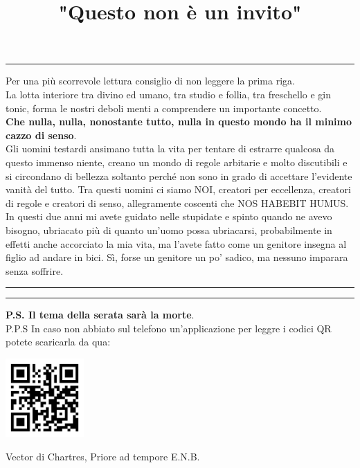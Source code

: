 \documentclass{article}
\title{"Questo non è un invito"}
\newcommand{\bb}[1]{\textbf{#1}}
\begin{document}
\maketitle
\hrule
\vspace{0.5cm}
Per una più scorrevole lettura consiglio di non leggere la prima riga.\\
La lotta interiore tra divino ed umano, tra studio e follia, tra freschello e gin tonic, forma le nostri deboli menti a comprendere un importante concetto.\\
\bb{Che nulla, nulla, nonostante tutto, nulla in questo mondo ha il minimo cazzo di senso}.\\
Gli uomini testardi ansimano tutta la vita per tentare di estrarre qualcosa da questo immenso niente, creano un mondo di regole arbitarie e molto discutibili e si circondano di bellezza soltanto perché non sono in grado di accettare l'evidente vanità del tutto.
Tra questi uomini ci siamo NOI, creatori per eccellenza, creatori di regole e creatori di senso, allegramente coscenti che NOS HABEBIT HUMUS.\\
In questi due anni mi avete guidato nelle stupidate e spinto quando ne avevo bisogno, ubriacato più di quanto un'uomo possa ubriacarsi, probabilmente in effetti anche accorciato la mia vita, ma l'avete fatto come un genitore insegna al figlio ad andare in bici. Sì, forse un genitore un po' sadico, ma nessuno imparara senza soffrire.\\
\hrule
\vspace{7cm}
\hrule
\vspace{0.5cm}
\bb{P.S. Il tema della serata sarà la morte}.\\
P.P.S In caso non abbiato sul telefono un'applicazione per leggre i codici QR potete scaricarla da qua:\\
\begin{center}
     \includegraphics[width=3cm, height=3cm]{pornhub.png}
\end{center}
\begin{flushright}
    Vector di Chartres, Priore ad tempore E.N.B.
\end{flushright}
\end{document}
